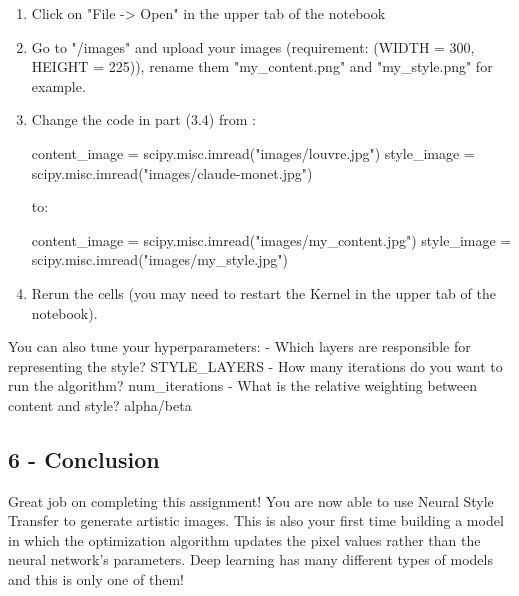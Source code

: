 \documentclass[11pt]{article}
\newenvironment{Shaded}{}{}
\newcommand{\StringTok}[1]{\textcolor[rgb]{0.25,0.44,0.63}{{#1}}}
\newcommand{\NormalTok}[1]{{#1}}
\newcommand{\OperatorTok}[1]{\textcolor[rgb]{0.40,0.40,0.40}{{#1}}}
\begin{document}
\begin{enumerate}
\def\labelenumi{\arabic{enumi}.}
\item
  Click on "File -\textgreater{} Open" in the upper tab of the notebook
\item
  Go to "/images" and upload your images (requirement: (WIDTH = 300,
  HEIGHT = 225)), rename them "my\_content.png" and "my\_style.png" for
  example.
\item
  Change the code in part (3.4) from :

\begin{Shaded}
\begin{Highlighting}[]
\NormalTok{content_image }\OperatorTok{=}\NormalTok{ scipy.misc.imread(}\StringTok{"images/louvre.jpg"}\NormalTok{)}
\NormalTok{style_image }\OperatorTok{=}\NormalTok{ scipy.misc.imread(}\StringTok{"images/claude-monet.jpg"}\NormalTok{)}
\end{Highlighting}
\end{Shaded}

  to:

\begin{Shaded}
\begin{Highlighting}[]
\NormalTok{content_image }\OperatorTok{=}\NormalTok{ scipy.misc.imread(}\StringTok{"images/my_content.jpg"}\NormalTok{)}
\NormalTok{style_image }\OperatorTok{=}\NormalTok{ scipy.misc.imread(}\StringTok{"images/my_style.jpg"}\NormalTok{)}
\end{Highlighting}
\end{Shaded}
\item
  Rerun the cells (you may need to restart the Kernel in the upper tab
  of the notebook).
\end{enumerate}

You can also tune your hyperparameters: - Which layers are responsible
for representing the style? STYLE\_LAYERS - How many iterations do you
want to run the algorithm? num\_iterations - What is the relative
weighting between content and style? alpha/beta

    \subsection{6 - Conclusion}\label{conclusion}

Great job on completing this assignment! You are now able to use Neural
Style Transfer to generate artistic images. This is also your first time
building a model in which the optimization algorithm updates the pixel
values rather than the neural network's parameters. Deep learning has
many different types of models and this is only one of them!
\end{document}
